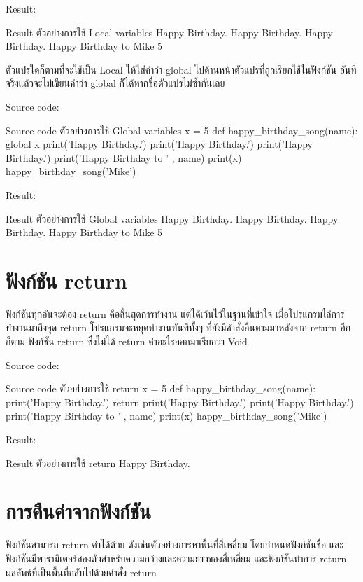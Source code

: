 Result:
\begin{codelist}{Result ตัวอย่างการใช้ Local variables}{}
Happy Birthday.
Happy Birthday.
Happy Birthday.
Happy Birthday to Mike
5
\end{codelist}


ตัวแปรใดก็ตามที่จะใช้เป็น Local ให้ใส่คำว่า global ไปด้านหน้าตัวแปรที่ถูกเรียกใช้ในฟังก์ชัน อันที่จริงแล้วจะไม่เขียนคำว่า global ก็ได้หากชื่อตัวแปรไม่ซ้ำกันเลย

Source code:
\begin{codelist}{Source code ตัวอย่างการใช้ Global variables}{}
x = 5
def happy_birthday_song(name):
    global x
    print('Happy Birthday.')
    print('Happy Birthday.')
    print('Happy Birthday.')
    print('Happy Birthday to ' , name)
    print(x)
happy_birthday_song('Mike')
\end{codelist}

Result:
\begin{codelist}{Result ตัวอย่างการใช้ Global variables}{}
Happy Birthday.
Happy Birthday.
Happy Birthday.
Happy Birthday to Mike
5
\end{codelist}

\section{ฟังก์ชัน return}

ฟังก์ชันทุกอันจะต้อง return คือสิ้นสุดการทำงาน แต่ได้เว้นไว้ในฐานที่เข้าใจ เมื่อโปรแกรมไล่การทำงานมาถึงจุด return โปรแกรมจะหยุดทำงานทันทีทั้งๆ ที่ยังมีคำสั่งอื่นตามมาหลังจาก return อีกก็ตาม  ฟังก์ชัน return ซึ่งไม่ได้ return ค่าอะไรออกมาเรียกว่า Void 

Source code:
\begin{codelist}{Source code ตัวอย่างการใช้ return}{}
x = 5
def happy_birthday_song(name):
    print('Happy Birthday.')
    return
    print('Happy Birthday.')
    print('Happy Birthday.')
    print('Happy Birthday to ' , name)
    print(x)
happy_birthday_song('Mike')
\end{codelist}

Result:
\begin{codelist}{Result ตัวอย่างการใช้ return}{}
Happy Birthday.
\end{codelist}

\section{การคืนค่าจากฟังก์ชัน}

ฟังก์ชันสามารถ return ค่าได้ด้วย ดังเช่นตัวอย่างการหาพื้นที่สี่เหลี่ยม โดยกำหนดฟังก์ชันชื่อ   และฟังก์ชันมีพารามิเตอร์สองตัวสำหรับความกว้างและความยาวของสี่เหลี่ยม และฟังก์ชันทำการ return ผลลัพธ์ที่เป็นพื้นที่กลับไปด้วยคำสั่ง return

